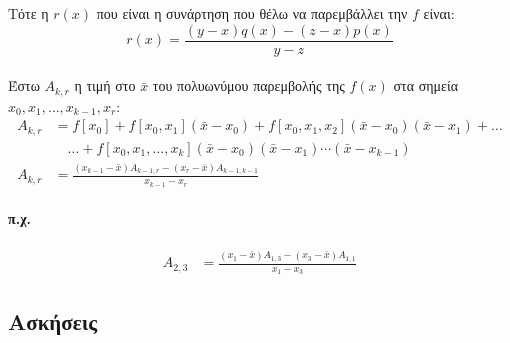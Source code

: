 \documentclass[11pt,a4paper,notitlepage,fleqn,final]{article}
\begin{document}
 	Τότε η \( r(x) \) που είναι η συνάρτηση που θέλω να
 	παρεμβάλλει την \( f \) είναι:
 	\[
 	\boxed{
 	r(x) = \frac{(y-x)q(x) - (z-x)p(x)}{y-z}
    }
 	\]

 	\paragraph{}
 	Έστω \( A_{k,r} \) η τιμή στο \( \bar x \) του πολυωνύμου
 	παρεμβολής της \( f(x) \) στα σημεία \( x_0,x_1,
 	\dots,x_{k-1},x_r \):
 	\begin{align*}
 	A_{k,r} &= f[x_0] + f[x_0,x_1](\bar x-x_0)
 	+ f[x_0,x_1,x_2](\bar x-x_0)(\bar x-x_1) + \dots
 	\\ &\quad \dots + f[x_0,x_1,\dots,x_k](\bar x-x_0)
 	(\bar x-x_1)\cdots(\bar x-x_{k-1}) \\
 	A_{k,r} &= \frac{(x_{k-1}-\bar x)A_{k-1,r}
 		-(x_r-\bar x)A_{k-1,k-1}}{x_{k-1}-x_r}
	\end{align*}




	\paragraph{π.χ.}
	\begin{align*}
		A_{2,3} &=
		\frac{(x_1-\bar x)A_{1,3}-(x_3-\bar x)A_{1,1}}{x_1-x_3}
	\end{align*}

	\subsection{Ασκήσεις}
\end{document}
